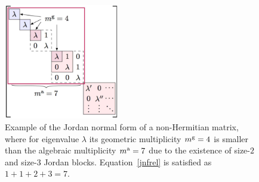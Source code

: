 \documentclass{tADP2e}
\theoremstyle{plain}
\theoremstyle{plain}
\theoremstyle{definition}
\begin{document}
\begin{figure}[!t]
\begin{center}
\includegraphics[width=5cm]{./Figures/Jordan.pdf}
\end{center}
\caption{Example of the Jordan normal form of a non-Hermitian matrix,  where {for eigenvalue $\lambda$} its geometric multiplicity $m^{\rm g}=4$ is smaller than the algebraic multiplicity $m^{\rm a}=7$ due to the existence of size-$2$  and  size-$3$ Jordan blocks.  Equation~\eqref{jnfrel} is satisfied as $1+1+2+3=7$. 
}
\label{fig:Jordan}
\end{figure}
\end{document}
